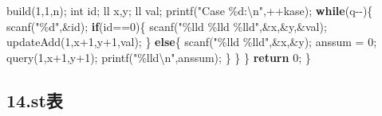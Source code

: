 \documentclass[
]{article}
\newenvironment{Shaded}{}{}
\newcommand{\ControlFlowTok}[1]{\textcolor[rgb]{0.00,0.44,0.13}{\textbf{#1}}}
\newcommand{\DataTypeTok}[1]{\textcolor[rgb]{0.56,0.13,0.00}{#1}}
\newcommand{\DecValTok}[1]{\textcolor[rgb]{0.25,0.63,0.44}{#1}}
\newcommand{\NormalTok}[1]{#1}
\newcommand{\OperatorTok}[1]{\textcolor[rgb]{0.40,0.40,0.40}{#1}}
\newcommand{\SpecialCharTok}[1]{\textcolor[rgb]{0.25,0.44,0.63}{#1}}
\newcommand{\StringTok}[1]{\textcolor[rgb]{0.25,0.44,0.63}{#1}}
\begin{document}
\begin{Shaded}
\begin{Highlighting}[]
\NormalTok{        build}\OperatorTok{(}\DecValTok{1}\OperatorTok{,}\DecValTok{1}\OperatorTok{,}\NormalTok{n}\OperatorTok{);}  
        \DataTypeTok{int}\NormalTok{ id}\OperatorTok{;}  
\NormalTok{        ll x}\OperatorTok{,}\NormalTok{y}\OperatorTok{;}  
\NormalTok{        ll val}\OperatorTok{;}  
\NormalTok{        printf}\OperatorTok{(}\StringTok{"Case }\SpecialCharTok{\%d}\StringTok{:}\SpecialCharTok{\textbackslash{}n}\StringTok{"}\OperatorTok{,++}\NormalTok{kase}\OperatorTok{);}  
        \ControlFlowTok{while}\OperatorTok{(}\NormalTok{q}\OperatorTok{{-}{-})\{}  
\NormalTok{            scanf}\OperatorTok{(}\StringTok{"}\SpecialCharTok{\%d}\StringTok{"}\OperatorTok{,\&}\NormalTok{id}\OperatorTok{);}  
            \ControlFlowTok{if}\OperatorTok{(}\NormalTok{id}\OperatorTok{==}\DecValTok{0}\OperatorTok{)\{}  
\NormalTok{                scanf}\OperatorTok{(}\StringTok{"}\SpecialCharTok{\%lld}\StringTok{ }\SpecialCharTok{\%lld}\StringTok{ }\SpecialCharTok{\%lld}\StringTok{"}\OperatorTok{,\&}\NormalTok{x}\OperatorTok{,\&}\NormalTok{y}\OperatorTok{,\&}\NormalTok{val}\OperatorTok{);}  
\NormalTok{                updateAdd}\OperatorTok{(}\DecValTok{1}\OperatorTok{,}\NormalTok{x}\OperatorTok{+}\DecValTok{1}\OperatorTok{,}\NormalTok{y}\OperatorTok{+}\DecValTok{1}\OperatorTok{,}\NormalTok{val}\OperatorTok{);}  
            \OperatorTok{\}}  
            \ControlFlowTok{else}\OperatorTok{\{}  
\NormalTok{                scanf}\OperatorTok{(}\StringTok{"}\SpecialCharTok{\%lld}\StringTok{ }\SpecialCharTok{\%lld}\StringTok{"}\OperatorTok{,\&}\NormalTok{x}\OperatorTok{,\&}\NormalTok{y}\OperatorTok{);}  
\NormalTok{                anssum }\OperatorTok{=} \DecValTok{0}\OperatorTok{;}  
\NormalTok{                query}\OperatorTok{(}\DecValTok{1}\OperatorTok{,}\NormalTok{x}\OperatorTok{+}\DecValTok{1}\OperatorTok{,}\NormalTok{y}\OperatorTok{+}\DecValTok{1}\OperatorTok{);}  
\NormalTok{                printf}\OperatorTok{(}\StringTok{"}\SpecialCharTok{\%lld\textbackslash{}n}\StringTok{"}\OperatorTok{,}\NormalTok{anssum}\OperatorTok{);}  
            \OperatorTok{\}} \OperatorTok{\}} \OperatorTok{\}}  
    \ControlFlowTok{return} \DecValTok{0}\OperatorTok{;}  
\OperatorTok{\}}  
\end{Highlighting}
\end{Shaded}

\hypertarget{14stux8868}{%
\subsection{14.st表}\label{14stux8868}}
\end{document}
